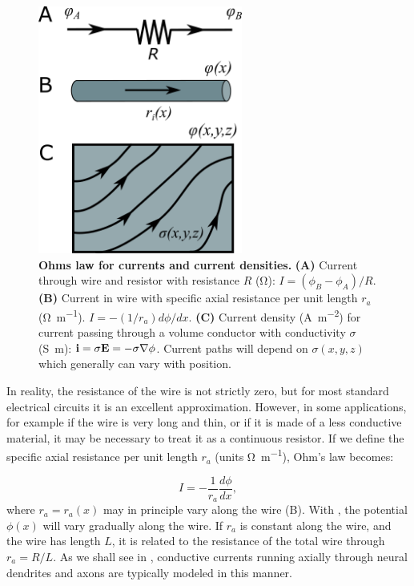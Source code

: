 \begin{figure}[!ht]
\begin{center}
\includegraphics[width=0.6\textwidth]{Figures/Basics/Currents.png}
\end{center}
\caption{{\bf Ohms law for currents and current densities.} {\bf (A)} Current through wire and resistor with resistance $R$ (\si{\ohm}): $I = (\phi_B-\phi_A)/R$. {\bf (B)} Current in wire with specific axial resistance per unit length $r_a$ (\si{\ohm\per\metre}).  $I=- (1/r_a) d\phi/dx$. {\bf (C)} Current density (\si{\ampere\per\square\metre}) for current passing through a volume conductor with conductivity $\sigma$ (\si{\siemens\metre}): ${\bf i} = \sigma {\bf E} = - \sigma {\bf \nabla} \phi$. Current paths will depend on $\sigma(x,y,z)$ which generally can vary with position.
}
\label{fig:Basics:Currents}
\end{figure}
In reality, the resistance of the wire is not strictly zero, but for most standard electrical circuits it is an excellent approximation. However, in some applications, for example if the wire is very long and thin, or if it is made of a less conductive material, it may be necessary to treat it as a continuous resistor. If we define the specific axial resistance per unit length $r_{a}$ (units \si{\ohm\per\metre}), Ohm's law becomes:

\begin{equation}
I = - \frac{1}{r_a}\frac{d\phi}{dx},
\label{eq:Basics:Ohm_r}
\end{equation}
where $r_a=r_a(x)$ may in principle vary along the wire (B). With , the potential $\phi(x)$ will vary gradually along the wire. If $r_a$ is constant along the wire, and the wire has length $L$, it is related to the resistance of the total wire through $r_a=R/L$. As we shall see in , conductive currents running axially through neural dendrites and axons are typically modeled in this manner. 

